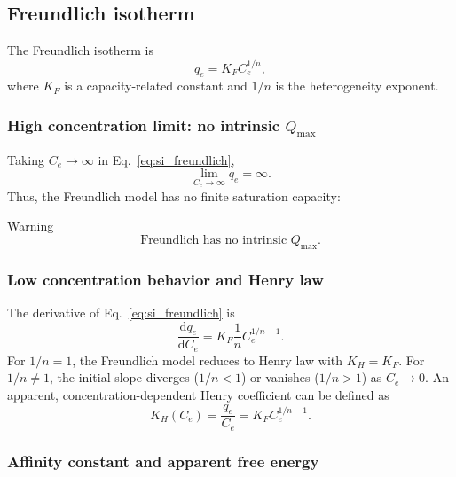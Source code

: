 \documentclass[journal=jacsat,manuscript=article]{achemso}
\begin{document}
\subsection{Freundlich isotherm}
\label{sec:si_freundlich}

The Freundlich isotherm is
\begin{equation}
	q_e = K_F C_e^{1/n},
	\label{eq:si_freundlich}
\end{equation}
where \(K_F\) is a capacity-related constant and \(1/n\) is the
heterogeneity exponent.

\subsubsection{High concentration limit: no intrinsic \(Q_{\max}\)}

Taking \(C_e \to \infty\) in Eq.~\eqref{eq:si_freundlich},
\begin{equation}
	\lim_{C_e \to \infty} q_e = \infty.
\end{equation}
Thus, the Freundlich model has no finite saturation capacity:
\begin{redbox}{Warning}
		\begin{equation}
		\text{Freundlich has no intrinsic } Q_{\max}.
	\end{equation}
\end{redbox}

\subsubsection{Low concentration behavior and Henry law}

The derivative of Eq.~\eqref{eq:si_freundlich} is
\begin{equation}
	\frac{\mathrm{d} q_e}{\mathrm{d} C_e}
	= K_F \frac{1}{n} C_e^{1/n - 1}.
\end{equation}
For \(1/n = 1\), the Freundlich model reduces to Henry law with
\(K_H = K_F\). For \(1/n \neq 1\), the initial slope diverges
(\(1/n < 1\)) or vanishes (\(1/n > 1\)) as \(C_e \to 0\).
An apparent, concentration-dependent Henry coefficient can be defined as
\begin{equation}
	K_H(C_e) = \frac{q_e}{C_e}
	= K_F C_e^{1/n - 1}.
\end{equation}

\subsubsection{Affinity constant and apparent free energy}
\end{document}
